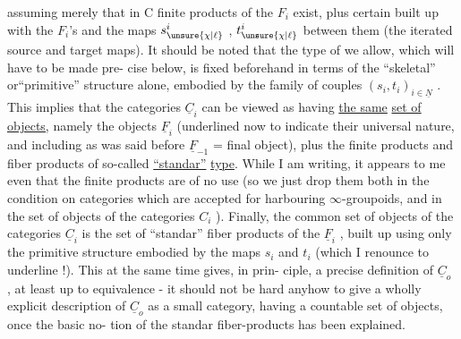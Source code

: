 
assuming merely that in C  finite products of the $F_i$ exist,
plus certain  built up with the $F_i$'s and the maps $s^{i}_{\unsure{\chi|\ell}}$ , $t^{i}_{\unsure{\chi|\ell}}$
between them (the iterated source and target maps). It should be noted
that the type of  we allow, which will have to be made pre-%
cise below, is fixed beforehand in terms of the ``skeletal'' or``primitive''
structure alone, embodied by the family of couples $(s_i,t_i)_{i\in\underline{N}}$ . This
implies that the  categories $\underline{C}_i$ can be viewed as having \uline{the same}
\uline{set of objects,} namely the objects $\underline{F}_i$ (underlined now to indicate their
universal nature, and including as was said before $\underline{F}_{-1}$ = final object),
plus the finite products and  fiber products of  so-called
\uline{``standar''} \uline{type}. While I am writing, it appears to me  even that the
finite products  are of no use (so we just drop them both in\unsure{)} the condition
on categories which are accepted for harbouring $\infty$-groupoids, and in the
set of objects of the categories $C_i$ ). Finally, the common set of objects
of the categories $\underline{C}_i$ is the set of ``standar''  fiber products of the $\underline{F}_i$ ,
built up using only the primitive structure embodied by the maps $s_i$ and $t_i$
(which I renounce  to underline !). This at the same time gives, in prin-%
ciple, a precise definition of $\underline{C}_o$ , at least up to equivalence - it
should not be hard anyhow to give a wholly explicit description of $\underline{C}_o$ as
a small category, having a countable set of objects, once the basic no-%
tion of the standar  fiber-products has been explained.

